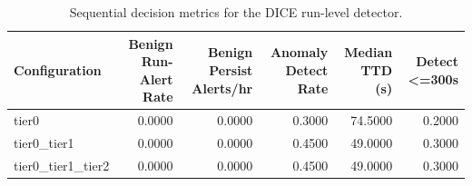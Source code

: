 \begin{table}[t]
\centering
\caption{Sequential decision metrics for the DICE run-level detector.}
\label{tab:dice_sequential_metrics}
\footnotesize
\begin{tabular}{lrrrrr}
\toprule
Configuration & Benign Run-Alert Rate & Benign Persist Alerts/hr & Anomaly Detect Rate & Median TTD (s) & Detect <=300s \\
\midrule
tier0 & 0.0000 & 0.0000 & 0.3000 & 74.5000 & 0.2000 \\
tier0_tier1 & 0.0000 & 0.0000 & 0.4500 & 49.0000 & 0.3000 \\
tier0_tier1_tier2 & 0.0000 & 0.0000 & 0.4500 & 49.0000 & 0.3000 \\
\bottomrule
\end{tabular}

\end{table}
